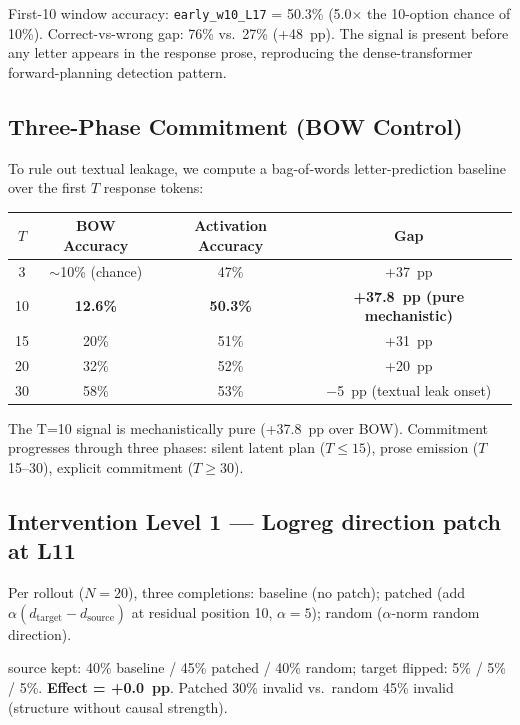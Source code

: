 \documentclass[11pt]{article}
\begin{document}
First-10 window accuracy: \texttt{early\_w10\_L17} = 50.3\% (5.0$\times$ the 10-option chance of 10\%). Correct-vs-wrong gap: 76\% vs.\ 27\% (+48~pp). The signal is present before any letter appears in the response prose, reproducing the dense-transformer forward-planning detection pattern.

\subsection{Three-Phase Commitment (BOW Control)}\label{sec:bow}

To rule out textual leakage, we compute a bag-of-words letter-prediction baseline over the first $T$ response tokens:

\begin{table}[h]
\centering
\begin{tabular}{cccc}
\toprule
$T$ & BOW Accuracy & Activation Accuracy & Gap \\
\midrule
3 & $\sim$10\% (chance) & 47\% & +37~pp \\
10 & \textbf{12.6\%} & \textbf{50.3\%} & \textbf{+37.8~pp (pure mechanistic)} \\
15 & 20\% & 51\% & +31~pp \\
20 & 32\% & 52\% & +20~pp \\
30 & 58\% & 53\% & $-$5~pp (textual leak onset) \\
\bottomrule
\end{tabular}
\end{table}

The T=10 signal is mechanistically pure (+37.8~pp over BOW). Commitment progresses through three phases: silent latent plan ($T \leq 15$), prose emission ($T$ 15--30), explicit commitment ($T \geq 30$).

\subsection{Intervention Level 1 --- Logreg direction patch at L11}\label{sec:v1}
Per rollout ($N=20$), three completions: baseline (no patch); patched (add $\alpha (d_\text{target} - d_\text{source})$ at residual position 10, $\alpha=5$); random ($\alpha$-norm random direction).

\begin{center}
source kept: 40\% baseline / 45\% patched / 40\% random; target flipped: 5\% / 5\% / 5\%.
\textbf{Effect = +0.0~pp}. Patched 30\% invalid vs.\ random 45\% invalid (structure without causal strength).
\end{center}
\end{document}
